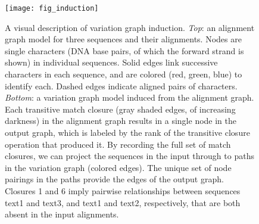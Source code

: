 \begin{figure}
   \texttt{[image: fig\_induction]}
   \caption{
   A visual description of variation graph induction.
   \textit{Top}: an alignment graph model for three sequences and their alignments.
   Nodes are single characters (DNA base pairs, of which the forward strand is shown) in individual sequences.
   Solid edges link successive characters in each sequence, and are colored (red, green, blue) to identify each.
   Dashed edges indicate aligned pairs of characters.
    \textit{Bottom}: a variation graph model induced from the alignment graph.
   Each transitive match closure (gray shaded edges, of increasing darkness) in the alignment graph results in a single node in the output graph, which is labeled by the rank of the transitive closure operation that produced it.
   By recording the full set of match closures, we can project the sequences in the input through to paths in the variation graph (colored edges).
   The unique set of node pairings in the paths provide the edges of the output graph.
   Closures 1 and 6 imply pairwise relationships between sequences text1 and text3, and text1 and text2, respectively, that are both absent in the input alignments.
    }
    \label{fig:induction}
\end{figure}

